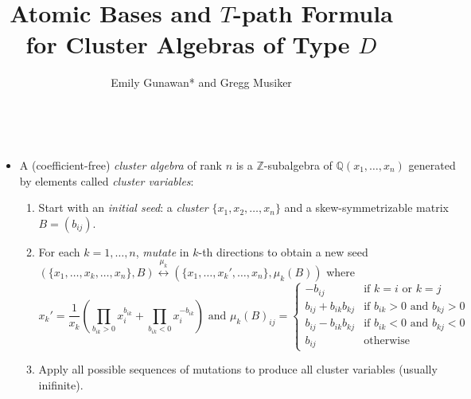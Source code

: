 \documentclass[a0paper, portrait, 17pt]{tikzposter}
\title{Atomic Bases and $T$-path Formula for Cluster Algebras of Type $D$} \author{Emily Gunawan* and Gregg Musiker}
\institute{University of Minnesota, School of Mathematics, Minneapolis, USA}
\begin{document}
 \maketitle
\begin{columns}
%

 {
\begin{itemize}

\item A (coefficient-free) \emph{cluster algebra}  of rank $n$  is a $\mathbb{Z}$-subalgebra of $\mathbb{Q}(x_1, \dots, x_n)$
generated by elements called \emph{cluster variables}:

\begin{enumerate}[-]
\item Start with an \emph{initial seed}: a \emph{cluster} $\{ x_1, x_2, \dots, x_n\}$
and a skew-symmetrizable matrix $B=(b_{ij})$.
\item For each $k=1,\dots,n$, \emph{mutate} in $k$-th directions to obtain a new seed
$\left( \{ x_1, \dots, {x_k}, \dots, x_n\},B \right) \overset{\mu_k}{\longleftrightarrow} 
\left( \{ x_1, \dots, {x_k'}, \dots, x_n\}, \mu_k(B) \right)$
where 
\[x_k' =\frac{1}{x_k}\left( {\prod_{b_{ik}>0} x_i^{b_{ik}} + \prod_{b_{ik}<0} x_i^{-b_{ik}}}\right)
\text{ and } \mu_k(B)_{ij}=
 \begin{cases}
 - b_{ij}&\text{if $k=i$ or $k=j$} \\
b_{ij} + b_{ik}b_{kj} &\text{if $b_{ik}>0$ and $b_{kj}>0$}\\
b_{ij} - b_{ik}b_{kj} &\text{if $b_{ik}<0$ and $b_{kj}<0$}\\
b_{ij} &\text{otherwise}
\end{cases}\]
\item Apply all possible sequences of mutations to produce all cluster variables (usually inifinite).
\end{enumerate}

%
%
\end{itemize}

}
\end{columns}
\end{document}
